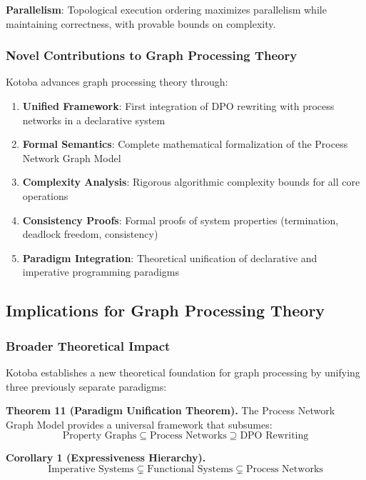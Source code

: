 \documentclass[11pt,a4paper]{article}
\begin{document}
\textbf{Parallelism}: Topological execution ordering maximizes parallelism while maintaining correctness, with provable bounds on complexity.

\subsubsection{Novel Contributions to Graph Processing Theory}
\label{subsubsec:novel_contributions}

Kotoba advances graph processing theory through:

\begin{enumerate}
\item \textbf{Unified Framework}: First integration of DPO rewriting with process networks in a declarative system
\item \textbf{Formal Semantics}: Complete mathematical formalization of the Process Network Graph Model
\item \textbf{Complexity Analysis}: Rigorous algorithmic complexity bounds for all core operations
\item \textbf{Consistency Proofs}: Formal proofs of system properties (termination, deadlock freedom, consistency)
\item \textbf{Paradigm Integration}: Theoretical unification of declarative and imperative programming paradigms
\end{enumerate}

\subsection{Implications for Graph Processing Theory}
\label{subsec:theory_implications}

\subsubsection{Broader Theoretical Impact}
\label{subsubsec:theory_impact}

Kotoba establishes a new theoretical foundation for graph processing by unifying three previously separate paradigms:

\textbf{Theorem 11 (Paradigm Unification Theorem).} The Process Network Graph Model provides a universal framework that subsumes:
\[
\text{Property Graphs} \subseteq \text{Process Networks} \supseteq \text{DPO Rewriting}
\]

\textbf{Corollary 1 (Expressiveness Hierarchy).}
\[
\text{Imperative Systems} \subsetneq \text{Functional Systems} \subsetneq \text{Process Networks}
\]
\end{document}
